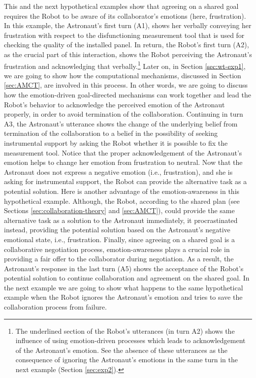 This and the next hypothetical examples show that agreeing on a shared goal
requires the Robot to be aware of its collaborator's emotions (here,
frustration). In this example, the Astronaut's first turn (A1), shows her
verbally conveying her frustration with respect to the disfunctioning
measurement tool that is used for checking the quality of the installed panel.
In return, the Robot's first turn (A2), as the crucial part of this interaction,
shows the Robot perceiving the Astronaut's frustration and acknowledging that
verbally.\footnote{The underlined section of the Robot's utterances (in turn A2)
shows the influence of using emotion-driven processes which leads to
acknowledgement of the Astronaut's emotion. See the absence of these utterances
as the consequence of ignoring the Astronaut's emotions in the same turn in the
next example (Section \ref{sec:exp2}).} Later on, in Section \ref{sec:wt-exp1},
we are going to show how the computational mechanisms, discussed in Section
\ref{sec:AMCT}, are involved in this process. In other words, we are going to
discuss how the emotion-driven goal-directed mechanisms can work together and
lead the Robot's behavior to acknowledge the perceived emotion of the Astronaut
properly, in order to avoid termination of the collaboration. Continuing in turn
A3, the Astronaut's utterance shows the change of the underlying belief from
termination of the collaboration to a belief in the possibility of seeking
instrumental support by asking the Robot whether it is possible to fix the
measurement tool. Notice that the proper acknowledgement of the Astronaut's
emotion helps to change her emotion from frustration to neutral. Now that the
Astronaut does not express a negative emotion (i.e., frustration), and she is
asking for instrumental support, the Robot can provide the alternative task as a
potential solution. Here is another advantage of the emotion-awareness in this
hypothetical example. Although, the Robot, according to the shared plan (see
Sections \ref{sec:collaboration-theory} and \ref{sec:AMCT}), could provide the
same alternative task as a solution to the Astronaut immediately, it
procrastinated instead, providing the potential solution based on the
Astronaut's negative emotional state, i.e., frustration. Finally, since agreeing
on a shared goal is a collaborative negotiation process, emotion-awareness plays
a crucial role in providing a fair offer to the collaborator during negotiation.
As a result, the Astronaut's response in the last turn (A5) shows the acceptance
of the Robot's potential solution to continue collaboration and agreement on the
shared goal. In the next example we are going to show what happens to the same
hypothetical example when the Robot ignores the Astronaut's emotion and tries to
save the collaboration process from failure.\\


